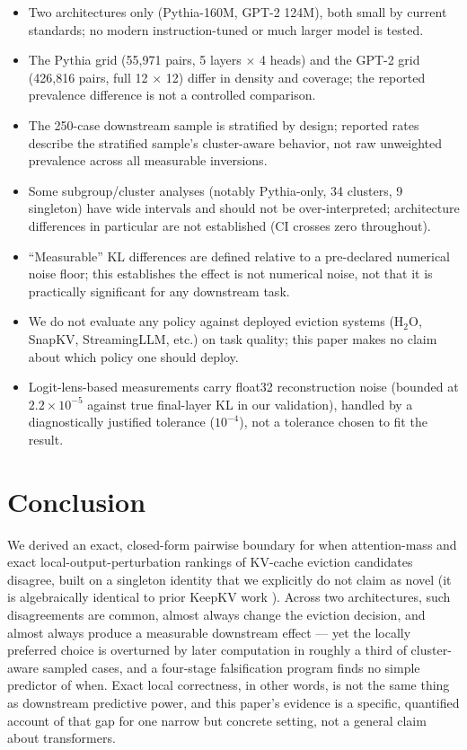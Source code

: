 \documentclass[11pt]{article}
\begin{document}
\begin{itemize}[nosep]
\item Two architectures only (Pythia-160M, GPT-2 124M), both small by
current standards; no modern instruction-tuned or much larger model is
tested.
\item The Pythia grid (55{,}971 pairs, 5 layers $\times$ 4 heads) and the
GPT-2 grid (426{,}816 pairs, full 12 $\times$ 12) differ in density and
coverage; the reported prevalence difference is not a controlled comparison.
\item The 250-case downstream sample is stratified by design; reported
rates describe the stratified sample's cluster-aware behavior, not raw
unweighted prevalence across all measurable inversions.
\item Some subgroup/cluster analyses (notably Pythia-only, 34 clusters, 9
singleton) have wide intervals and should not be over-interpreted;
architecture differences in particular are not established (CI crosses
zero throughout).
\item ``Measurable'' KL differences are defined relative to a pre-declared
numerical noise floor; this establishes the effect is not numerical noise,
not that it is practically significant for any downstream task.
\item We do not evaluate any policy against deployed eviction systems
(H$_2$O, SnapKV, StreamingLLM, etc.) on task quality; this paper makes no
claim about which policy one should deploy.
\item Logit-lens-based measurements carry float32 reconstruction noise
(bounded at $2.2\times10^{-5}$ against true final-layer KL in our
validation), handled by a diagnostically justified tolerance
($10^{-4}$), not a tolerance chosen to fit the result.
\end{itemize}

\section{Conclusion}
\label{sec:conclusion}

We derived an exact, closed-form pairwise boundary for when attention-mass
and exact local-output-perturbation rankings of KV-cache eviction candidates
disagree, built on a singleton identity that we explicitly do not claim as
novel (it is algebraically identical to prior KeepKV work
\cite{keepkv2025}). Across two architectures, such disagreements are common,
almost always change the eviction decision, and almost always produce a
measurable downstream effect --- yet the locally preferred choice is
overturned by later computation in roughly a third of cluster-aware sampled
cases, and a four-stage falsification program finds no simple predictor of
when. Exact local correctness, in other words, is not the same thing as
downstream predictive power, and this paper's evidence is a specific,
quantified account of that gap for one narrow but concrete setting, not a
general claim about transformers.
\end{document}
